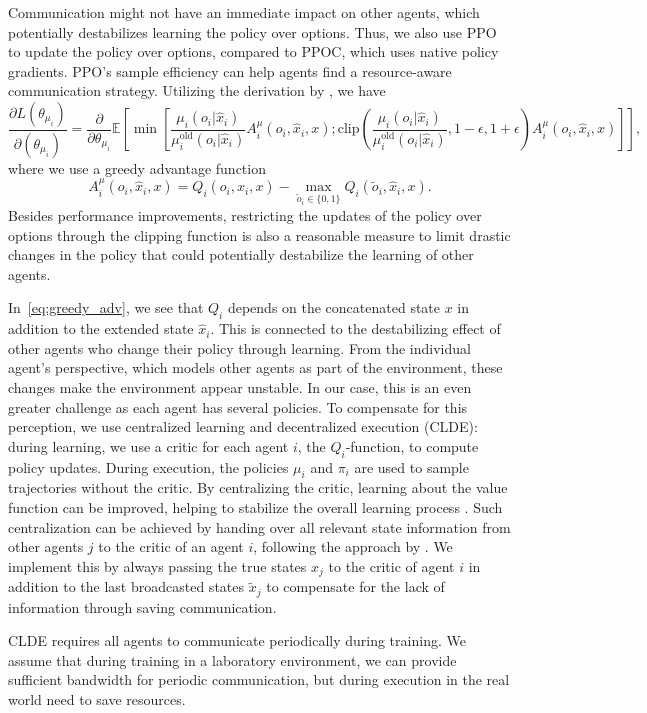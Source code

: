 \documentclass[12pt, final]{l4dc2023}
\begin{document}
Communication might not have an immediate impact on other agents, which potentially destabilizes learning the policy over options. Thus, we also use PPO to update the policy over options, compared to PPOC, which uses native policy gradients. PPO's sample efficiency can help agents find a resource-aware communication strategy. Utilizing the derivation by \cite{funk2021learning}, we have 
\begin{equation}
    \frac{\partial L(\theta_{\mu_i})}{\partial(\theta_{\mu_i})} 
   \! =\! \frac{\partial}{\partial \theta_{\mu_i}}\mathbb{E}[ 
    \min[\frac{\mu_{i}(o_i\vert \hat{x}_i)}{\mu^\mathrm{old}_{i}(o_i\vert \hat{x}_i)}A^{\mu}_{i}(o_i, \hat{x}_i, x); 
    \text{clip}(\frac{\mu_{i}(o_i\vert \hat{x}_i)}{\mu^\mathrm{old}_{i}(o_i\vert \hat{x}_i)}, 1-\epsilon,1+\epsilon) A^{\mu}_{i}(o_i, \hat{x}_i, x)]],
    \label{eq:loss_mu}
\end{equation} 
where we use a greedy advantage function
\begin{equation}
    A^{\mu}_{i}(o_i, \hat{x}_i, x)=Q_i (o_i, \hat{x}_i, x)-\max_{\tilde{o}_i\in\{0,1\}}Q_i(\tilde{o}_i, \hat{x}_i, x).
    \label{eq:greedy_adv}
\end{equation}
Besides performance improvements, restricting the updates of the policy over options through the clipping function is also a reasonable measure to limit drastic changes in the policy that could potentially destabilize the learning of other agents.

In~\eqref{eq:greedy_adv}, we see that $Q_i$ depends on the concatenated state $x$ in addition to the extended state $\hat{x}_i$.
This is connected to the destabilizing effect of other agents who change their policy through learning.
From the individual agent's perspective, which models other agents as part of the environment, these changes make the environment appear unstable.
In our case, this is an even greater challenge as each agent has several policies. To compensate for this perception, we use centralized learning and decentralized execution (CLDE): during learning, we use a critic for each agent $i$, \ie the $Q_i$-function, to compute policy updates. During execution, the policies $\mu_i$ and $\pi_i$ are used to sample trajectories without the critic. By centralizing the critic, learning about the value function can be improved, helping to stabilize the overall learning process \citep{Lyu.b}. Such centralization can be achieved by handing over all relevant state information from other agents $j$ to the critic of an agent $i$, following the approach by \cite{Lowe.2017}. We implement this by always passing the true states $x_j$ to the critic of agent $i$ in addition to the last broadcasted states $\tilde{x}_j$ to compensate for the lack of information through saving communication.
\begin{remark}
CLDE requires all agents to communicate periodically during training.
We assume that during training in a laboratory environment, we can provide sufficient bandwidth for periodic communication, but during execution in the real world need to save resources.
\end{remark}
\end{document}
